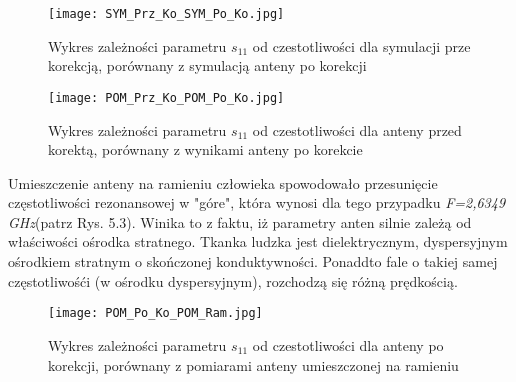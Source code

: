 \begin{figure}[h!]
\centering
	\texttt{[image: SYM\_Prz\_Ko\_SYM\_Po\_Ko.jpg]}
	\caption{Wykres zależności parametru $s_{11}$ od czestotliwości dla symulacji prze korekcją, porównany z symulacją anteny po korekcji}
\end{figure}


\begin{figure}[h!]
\centering
	\texttt{[image: POM\_Prz\_Ko\_POM\_Po\_Ko.jpg]}
	\caption{Wykres zależności parametru $s_{11}$ od czestotliwości dla anteny przed korektą, porównany z wynikami anteny po korekcie}
\end{figure}



\newpage
\noindent
\newline Umieszczenie anteny na ramieniu człowieka spowodowało przesunięcie częstotliwości rezonansowej w "góre", która wynosi dla tego przypadku \emph{F=2,6349 GHz}(patrz Rys. 5.3). Winika to z faktu, iż parametry anten silnie zależą od właściwości ośrodka stratnego.  
Tkanka ludzka jest dielektrycznym, dyspersyjnym ośrodkiem stratnym o skończonej konduktywności. Ponaddto fale o takiej samej częstotliwośći (w ośrodku dyspersyjnym), rozchodzą się różną prędkością. 

\begin{figure}[h!]
\centering
	\texttt{[image: POM\_Po\_Ko\_POM\_Ram.jpg]}
	\caption{Wykres zależności parametru $s_{11}$ od czestotliwości dla anteny po korekcji, porównany z pomiarami anteny umieszczonej na ramieniu}
\end{figure}








